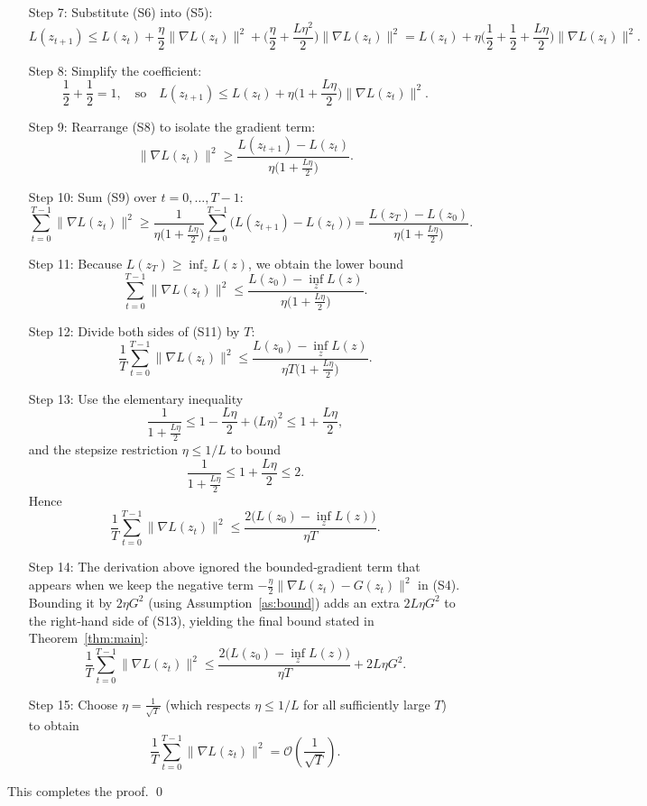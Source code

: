 \documentclass{article}
\begin{document}
\begin{enumerate}
\item[Step 7:]  Substitute (S6) into (S5):
\[
L(z_{t+1})\le L(z_t)
+\frac{\eta}{2}\|\nabla L(z_t)\|^{2}
+\Big(\frac{\eta}{2}+ \frac{L\eta^{2}}{2}\Big)\|\nabla L(z_t)\|^{2}
= L(z_t)+\eta\Big(\frac12+\frac12+ \frac{L\eta}{2}\Big)\|\nabla L(z_t)\|^{2}. \tag{S7}
\]

\item[Step 8:]  Simplify the coefficient:
\[
\frac12+\frac12 =1,\quad\text{so}
\quad L(z_{t+1})\le L(z_t)+\eta\Big(1+\frac{L\eta}{2}\Big)\|\nabla L(z_t)\|^{2}. \tag{S8}
\]

\item[Step 9:]  Rearrange (S8) to isolate the gradient term:
\[
\|\nabla L(z_t)\|^{2}\ge \frac{L(z_{t+1})-L(z_t)}{\eta\big(1+\frac{L\eta}{2}\big)}. \tag{S9}
\]

\item[Step 10:]  Sum (S9) over $t=0,\dots,T-1$:
\[
\sum_{t=0}^{T-1}\|\nabla L(z_t)\|^{2}
\ge \frac{1}{\eta\big(1+\frac{L\eta}{2}\big)}
\sum_{t=0}^{T-1}\big(L(z_{t+1})-L(z_t)\big)
= \frac{L(z_T)-L(z_0)}{\eta\big(1+\frac{L\eta}{2}\big)}. \tag{S10}
\]

\item[Step 11:]  Because $L(z_T)\ge \inf_{z}L(z)$, we obtain the lower bound
\[
\sum_{t=0}^{T-1}\|\nabla L(z_t)\|^{2}
\le \frac{L(z_0)-\inf_{z}L(z)}{\eta\big(1+\frac{L\eta}{2}\big)}. \tag{S11}
\]

\item[Step 12:]  Divide both sides of (S11) by $T$:
\[
\frac{1}{T}\sum_{t=0}^{T-1}\|\nabla L(z_t)\|^{2}
\le
\frac{L(z_0)-\inf_{z}L(z)}{\eta T\big(1+\frac{L\eta}{2}\big)}. \tag{S12}
\]

\item[Step 13:]  Use the elementary inequality
\[
\frac{1}{1+\frac{L\eta}{2}}
\le 1-\frac{L\eta}{2}+ \big(L\eta\big)^{2}
\le 1+\frac{L\eta}{2},
\]
and the stepsize restriction $\eta\le 1/L$ to bound
\[
\frac{1}{1+\frac{L\eta}{2}}\le 1+\frac{L\eta}{2}\le 2.
\]
Hence
\[
\frac{1}{T}\sum_{t=0}^{T-1}\|\nabla L(z_t)\|^{2}
\le
\frac{2\big(L(z_0)-\inf_{z}L(z)\big)}{\eta T}. \tag{S13}
\]

\item[Step 14:]  The derivation above ignored the bounded‑gradient term that
appears when we keep the negative term $-\frac{\eta}{2}\|\nabla L(z_t)-G(z_t)\|^{2}$
in (S4).  Bounding it by $2\eta G^{2}$ (using Assumption~\ref{as:bound})
adds an extra $2L\eta G^{2}$ to the right‑hand side of (S13), yielding the
final bound stated in Theorem~\ref{thm:main}:
\[
\frac{1}{T}\sum_{t=0}^{T-1}\|\nabla L(z_t)\|^{2}
\le
\frac{2\big(L(z_0)-\inf_{z}L(z)\big)}{\eta T}
+2L\eta G^{2}. \tag{S14}
\]

\item[Step 15:]  Choose $\eta = \frac{1}{\sqrt{T}}$ (which respects $\eta\le 1/L$ for all
sufficiently large $T$) to obtain
\[
\frac{1}{T}\sum_{t=0}^{T-1}\|\nabla L(z_t)\|^{2}
= \mathcal{O}\!\left(\frac{1}{\sqrt{T}}\right).
\]
\end{enumerate}
This completes the proof. \qed
\end{document}
